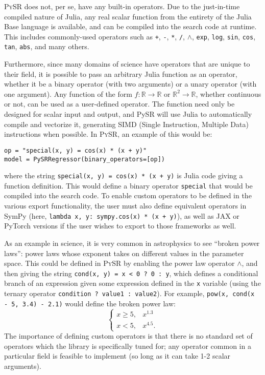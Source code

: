 \documentclass[letterpaper,twocolumn]{scrartcl}
\newcommand\pysr{\textsc{PySR}\xspace}
\begin{document}
\begin{linenumbers}
\pysr does not, per se, have any built-in operators.
Due to the just-in-time compiled nature of Julia, any real scalar function from the entirety of the Julia Base language is available, and can be compiled into the search code at runtime.
This includes commonly-used operators such as
\texttt{+},
\texttt{-},
\texttt{*},
\texttt{/},
$\wedge$,
\texttt{exp},
\texttt{log},
\texttt{sin},
\texttt{cos},
\texttt{tan},
\texttt{abs},
and many others.

Furthermore, since many domains of science have operators that are unique to their field, it is possible to pass an arbitrary Julia function as an operator, whether it be a binary operator (with two arguments) or a unary operator (with one argument).
Any function of the form
$f:\mathbb{R}\rightarrow \mathbb{R}$ or $\mathbb{R}^2\rightarrow\mathbb{R}$, whether
continuous or not,
can be used as a user-defined operator.
The function need only be designed for scalar input and output, and PySR will use Julia to automatically compile and vectorize it, generating SIMD (Single Instruction, Multiple Data) instructions when possible.
In \pysr, an example of this would be:
\begin{minipage}{0.95\linewidth}
\begin{verbatim}
op = "special(x, y) = cos(x) * (x + y)"
model = PySRRegressor(binary_operators=[op])
\end{verbatim}
\end{minipage}
where the string \texttt{special(x, y) = cos(x) * (x + y)} is Julia code giving a function definition.
This would define a binary operator \texttt{special} that would be compiled into the search code.
To enable custom operators to be defined in the various export functionality, the user must also define equivalent operators in SymPy (here, \texttt{lambda x, y: sympy.cos(x) * (x + y)}), as well as JAX or PyTorch versions if the user wishes to export to those frameworks as well.

As an example in science, it is very common in astrophysics to see ``broken power laws'': power laws whose exponent takes on different values in the parameter space.
This could be defined in \pysr by enabling the power law operator $\wedge$, and then giving the string \texttt{cond(x, y) = x < 0 ? 0 : y}, which defines a conditional branch of an expression given some expression defined in the \texttt{x} variable (using the ternary operator \texttt{condition ? value1 : value2}).
For example, \texttt{pow(x, cond(x - 5, 3.4) - 2.1)} would define the broken power law:
$$
\left\{
\begin{array}{cr}
x \geq 5, & x^{1.3}\\
x < 5, & x^{4.5}.
\end{array}
\right.
$$
The importance of defining custom operators is that there is no standard set of operators which the library is specifically tuned for; any operator common in a particular field is feasible to implement (so long as it can take 1-2 scalar arguments).



\end{linenumbers}
\end{document}
